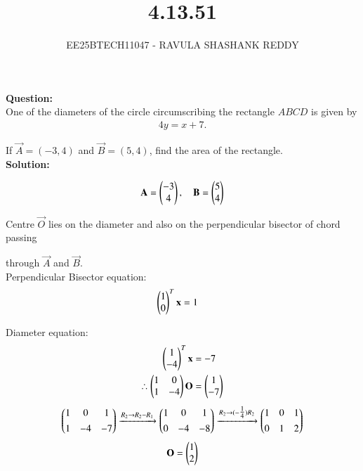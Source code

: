 \documentclass[journal]{article}
\begin{document}
	
	
	\vspace{3cm}
	
\title{4.13.51}
\author{EE25BTECH11047 - RAVULA SHASHANK REDDY}
\maketitle
\hrulefill
\bigskip 

\renewcommand{\thetable}{\theenumi}
\setlength{\intextsep}{10pt}

\textbf{Question:} \\

One of the diameters of the circle circumscribing the rectangle \(ABCD\) is given by
\begin{align*}
4y = x + 7.
\end{align*}

If \(\vec{A}=(-3,4)\) and \(\vec{B}=(5,4)\), find the area of the rectangle.\\

\textbf{Solution:}

\begin{align}
\mathbf{A}=\begin{pmatrix}-3\\4\end{pmatrix},\quad \mathbf{B}=\begin{pmatrix}5\\4\end{pmatrix}
\end{align}

Centre \(\vec{O}\) lies on the diameter and also on the perpendicular bisector of chord passing  

through \(\vec{A}\) and \(\vec{B}\).\\

Perpendicular Bisector equation:
\begin{align}
\begin{pmatrix}1 \\ 0\end{pmatrix}^T\mathbf{x}&=1
\end{align}

Diameter equation:
\begin{align}
\begin{pmatrix}1 \\ -4\end{pmatrix}^T\mathbf{x}&=-7\\
\therefore
\begin{pmatrix}1 & 0\\ 1 & -4\end{pmatrix}\mathbf{O} &= \begin{pmatrix}1\\-7\end{pmatrix}
\end{align}
\begin{align}
\begin{pmatrix}1 & 0 & 1\\[4pt] 1 & -4 & -7\end{pmatrix}
\xrightarrow{R_2\rightarrow R_2-R_1}
\begin{pmatrix}1 & 0 & 1\\[4pt] 0 & -4 & -8\end{pmatrix}
\xrightarrow{R_2\rightarrow (-\tfrac{1}{4})R_2}
\begin{pmatrix}1 & 0 & 1\\[4pt] 0 & 1 & 2\end{pmatrix}
\end{align}
\begin{align}
    \mathbf{O}=\begin{pmatrix}1\\2\end{pmatrix}
\end{align}
\end{document}
